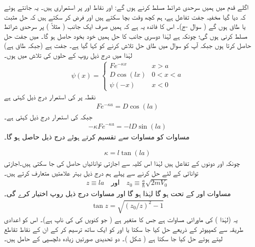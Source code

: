  اگلے قدم میں ہمیں سرحدی شرائط مسلط کرنے ہوں گے: اور  نقاط  اور پر استمراری ہیں۔ یہ جانتے ہوئے کہ دیا گیا مخفیہ جفت تفاعل ہے، ہم کچھ وقت بچا سکتے ہیں اور فرض کر سکتے ہیں کہ حل مثبت یا طاق ہوں گے ( سوال -ج)۔ اس کا فائدہ یہ ہے کہ ہمیں صرف ایک جانب ( مثلاً ) پر سرحدی شرائط مسلط کرنی ہوں گی؛ چونکہ ہے لہٰذا دوسری جانب کا حل ہمیں خود بخود حاصل ہو گا۔ میں جفت حل حاصل کرتا ہوں جبکہ آپ کو سوال  میں طاق حل تلاش کرنے کو کہا گیا ہے۔ جفت ہے (جبکہ طاق ہے) لہٰذا میں درج ذیل روپ کے حلوں کی تلاش میں ہوں۔ 
\begin{align}\label{مساوات_شروڈنگر_تلاش_تفاعلات}
\psi(x)=
\begin{cases}
Fe^{-\kappa x} & x> a\\
D\cos(l x) & 0< x < a\\
\psi(-x) & x< 0
\end{cases}
\end{align}
نقطہ پر  کی استمرار درج ذیل کہتی ہے 
\begin{align}\label{مساوات_شروڈنگر_استمرار_مستقل_الف}
 Fe^{-\kappa a}=D\cos(la) 
 \end{align}
 جبکہ  کی استمرار درج ذیل کہتی ہے۔
 \begin{align}\label{مساوات_شروڈنگر_استمرار_مستقل_ب}
 -\kappa Fe^{-\kappa a}=-lD\sin(la) 
 \end{align} 
 مساوات  کو مساوات  سے تقسیم کرتے ہوئے درج ذیل حاصل ہو گا۔

\begin{align}\label{مساوات_شروڈنگر_حل_کپا}
\kappa =l\tan(la) 
 \end{align}
 چونکہ  اور  دونوں  کے تفاعل ہیں لہٰذا اس کلیہ سے اجازتی توانائیاں حاصل کی جا سکتی ہیں۔اجازتی توانائی کے لئے حل کرنے سے پہلے ہم درج ذیل بہتر علامتیں متعارف کرتے ہیں۔
\begin{align}
z\equiv l a \quad \text{اور}\quad z_0\equiv\frac{a}{\hslash}\sqrt{2mV_0}
\end{align} 
مساوات  اور  کے تحت  ہو گا لہٰذا  ہو گا اور مساوات  درج ذیل روپ اختیار کرے گی۔
\begin{align}\label{مساوات_غیر_تابع_شروڈنگر_ترسیمی_حل}
\tan z=\sqrt{(z_{0}/z)^{2}-1} 
\end{align}
 یہ  (لہٰذا ) کی ماورائی مساوات ہے جس کا متغیر  ہے ( جو کنویں کی کی ناپ ہے)۔ اس کو اعدادی طریقہ سے کمپیوٹر کے ذریعے حل کیا جا سکتا یا  اور  کو ایک ساتھ ترسیم کر کے ان کے نقاط تقاطع لیتے ہوئے حل کیا جا سکتا ہے ( شکل )۔ دو تحدیدی صورتیں زیادہ دلچسپی کے حامل ہیں۔ 
 
